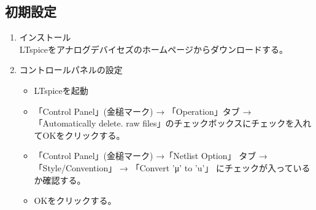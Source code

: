 \subsection{初期設定}
\begin{enumerate}
  \setlength{\parskip}{0cm} %
  \setlength{\itemsep}{0cm} %
  \item インストール \\
  LTspiceをアナログデバイセズのホームページからダウンロードする。
  \item コントロールパネルの設定
  \begin{itemize}
    \setlength{\parskip}{0cm} %
    \setlength{\itemsep}{0cm} %
    \item LTspiceを起動
    \item 「Control Panel」(金槌マーク) → 「Operation」タブ → 「Automatically delete. raw files」のチェックボックスにチェックを入れてOKをクリックする。
    \item 「Control Panel」(金槌マーク) →「Netlist Option」 タブ → 「Style/Convention」 → 「Convert 'μ' to 'u'」 にチェックが入っているか確認する。
    \item OKをクリックする。
  \end{itemize}


\end{enumerate}
